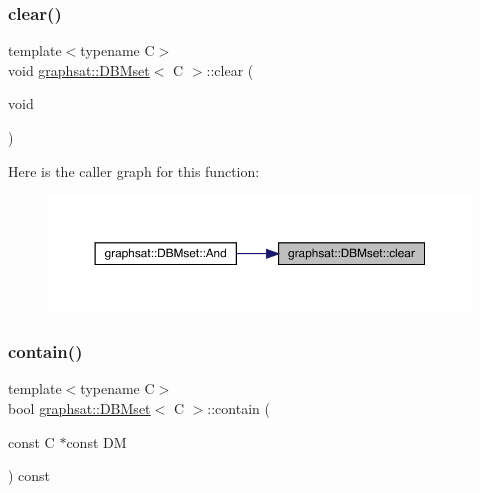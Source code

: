 \mbox{\label{classgraphsat_1_1_d_b_mset_ade231bd44d2559778e4cfb95a9e97214}} 
\subsubsection{\texorpdfstring{clear()}{clear()}}
{\footnotesize\ttfamily template$<$typename C$>$ \\
void \mbox{\hyperlink{classgraphsat_1_1_d_b_mset}{graphsat\+::\+D\+B\+Mset}}$<$ C $>$\+::clear (\begin{DoxyParamCaption}\item[{void}]{ }\end{DoxyParamCaption})\hspace{0.3cm}{\ttfamily [inline]}}

Here is the caller graph for this function\+:\nopagebreak
\begin{figure}[H]
\begin{center}
\leavevmode
\includegraphics[width=350pt]{classgraphsat_1_1_d_b_mset_ade231bd44d2559778e4cfb95a9e97214_icgraph}
\end{center}
\end{figure}
\mbox{\label{classgraphsat_1_1_d_b_mset_a3ccc996dbe06983ad22b15791c0d8173}} 
\subsubsection{\texorpdfstring{contain()}{contain()}}
{\footnotesize\ttfamily template$<$typename C$>$ \\
bool \mbox{\hyperlink{classgraphsat_1_1_d_b_mset}{graphsat\+::\+D\+B\+Mset}}$<$ C $>$\+::contain (\begin{DoxyParamCaption}\item[{const C $\ast$const}]{DM }\end{DoxyParamCaption}) const\hspace{0.3cm}{\ttfamily [inline]}}

